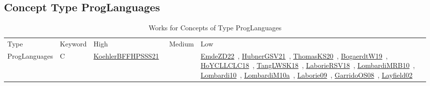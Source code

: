 \clearpage
\subsection{Concept Type ProgLanguages}
\label{sec:ProgLanguages}
{\scriptsize
\begin{longtable}{lp{3cm}>{\raggedright\arraybackslash}p{6cm}>{\raggedright\arraybackslash}p{6cm}>{\raggedright\arraybackslash}p{8cm}}
\rowcolor{white}\caption{Works for Concepts of Type ProgLanguages}\\ \toprule
\rowcolor{white}Type & Keyword & High & Medium & Low\\ \midrule\endhead
\bottomrule
\endfoot
ProgLanguages & C  & \href{../works/KoehlerBFFHPSSS21.pdf}{KoehlerBFFHPSSS21}~\cite{KoehlerBFFHPSSS21} &  & \href{../works/EmdeZD22.pdf}{EmdeZD22}~\cite{EmdeZD22}, \href{../works/HubnerGSV21.pdf}{HubnerGSV21}~\cite{HubnerGSV21}, \href{../works/ThomasKS20.pdf}{ThomasKS20}~\cite{ThomasKS20}, \href{../works/BogaerdtW19.pdf}{BogaerdtW19}~\cite{BogaerdtW19}, \href{../works/HoYCLLCLC18.pdf}{HoYCLLCLC18}~\cite{HoYCLLCLC18}, \href{../works/TangLWSK18.pdf}{TangLWSK18}~\cite{TangLWSK18}, \href{../works/LaborieRSV18.pdf}{LaborieRSV18}~\cite{LaborieRSV18}, \href{../works/LombardiMRB10.pdf}{LombardiMRB10}~\cite{LombardiMRB10}, \href{../works/Lombardi10.pdf}{Lombardi10}~\cite{Lombardi10}, \href{../works/LombardiM10a.pdf}{LombardiM10a}~\cite{LombardiM10a}, \href{../works/Laborie09.pdf}{Laborie09}~\cite{Laborie09}, \href{../works/GarridoOS08.pdf}{GarridoOS08}~\cite{GarridoOS08}, \href{../works/Layfield02.pdf}{Layfield02}~\cite{Layfield02}\\

\end{longtable}}
